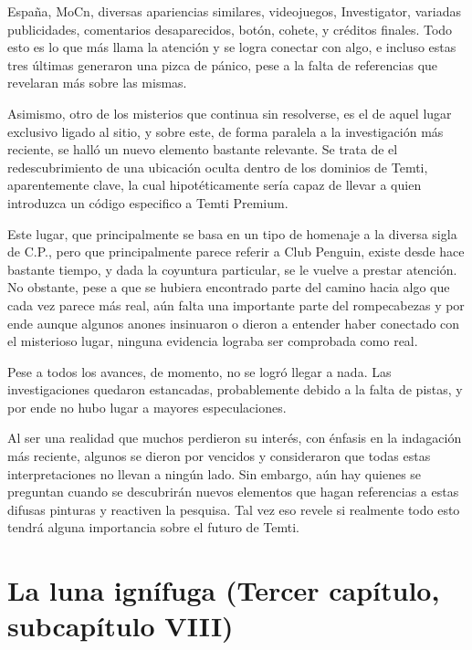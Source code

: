 \documentclass[
  spanish,
]{book}
\begin{document}
España, MoCn, diversas apariencias similares, videojuegos, Investigator, variadas publicidades, comentarios desaparecidos, botón, cohete, y créditos finales. Todo esto es lo que más llama la atención y se logra conectar con algo, e incluso estas tres últimas generaron una pizca de pánico, pese a la falta de referencias que revelaran más sobre las mismas.

Asimismo, otro de los misterios que continua sin resolverse, es el de aquel lugar exclusivo ligado al sitio, y sobre este, de forma paralela a la investigación más reciente, se halló un nuevo elemento bastante relevante. Se trata de el redescubrimiento de una ubicación oculta dentro de los dominios de Temti, aparentemente clave, la cual hipotéticamente sería capaz de llevar a quien introduzca un código especifico a Temti Premium.

Este lugar, que principalmente se basa en un tipo de homenaje a la diversa sigla de C.P., pero que principalmente parece referir a Club Penguin, existe desde hace bastante tiempo, y dada la coyuntura particular, se le vuelve a prestar atención. No obstante, pese a que se hubiera encontrado parte del camino hacia algo que cada vez parece más real, aún falta una importante parte del rompecabezas y por ende aunque algunos anones insinuaron o dieron a entender haber conectado con el misterioso lugar, ninguna evidencia lograba ser comprobada como real.

Pese a todos los avances, de momento, no se logró llegar a nada. Las investigaciones quedaron estancadas, probablemente debido a la falta de pistas, y por ende no hubo lugar a mayores especulaciones.

Al ser una realidad que muchos perdieron su interés, con énfasis en la indagación más reciente, algunos se dieron por vencidos y consideraron que todas estas interpretaciones no llevan a ningún lado. Sin embargo, aún hay quienes se preguntan cuando se descubrirán nuevos elementos que hagan referencias a estas difusas pinturas y reactiven la pesquisa. Tal vez eso revele si realmente todo esto tendrá alguna importancia sobre el futuro de Temti.

\hypertarget{la-luna-ignuxedfuga-tercer-capuxedtulo-subcapuxedtulo-viii}{%
\section{La luna ignífuga (Tercer capítulo, subcapítulo VIII)}\label{la-luna-ignuxedfuga-tercer-capuxedtulo-subcapuxedtulo-viii}}
\end{document}
